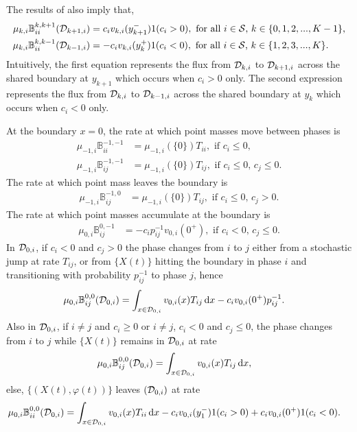 The results of \cite{bo2014} also imply that, 
\begin{align*}
\mu_{k,i}\mathbb B_{ii}^{k,k+1}(\mathcal{D}_{k+1,i})&= c_iv_{k,i}(y_{k+1}^-) 1{(c_i>0)},\mbox{ for all \(i\in\mathcal{S}\), \(k\in\{0,1,2,...,K-1\}\),}
\\\mu_{k,i}\mathbb B_{ii}^{k,k-1}(\mathcal{D}_{k-1,i})&= -c_iv_{k,i}(y_{k}^+) 1{(c_i<0)}, \mbox{  for all \(i\in\mathcal{S}\), \(k\in\{1,2,3,...,K\}\)}.
\end{align*}
Intuitively, the first equation represents the flux from \(\mathcal{D}_{k,i}\) to \(\mathcal{D}_{k+1,i}\) across the shared boundary at \(y_{k+1}\) which occurs when \(c_i>0\) only. The second expression represents the flux from \(\mathcal{D}_{k,i}\) to \(\mathcal{D}_{k-1,i}\) across the shared boundary at \(y_{k}\) which occurs when \(c_i<0\) only. 

At the boundary \(x=0\), the rate at which point masses move between phases is 
\begin{align*}
	\mu_{-1,i}\mathbb B_{ii}^{{-1},{-1}} &= \mu_{-1,i}(\{0\})T_{ii},\mbox{ if } c_i\leq 0,\,\\
	\mu_{-1,i}\mathbb B_{ij}^{{-1},{-1}} &= \mu_{-1,i}(\{0\})T_{ij},\mbox{ if }c_i\leq 0,\,c_j\leq 0. 
	\end{align*}
	The rate at which point mass leaves the boundary is
	\begin{align*}
	\mu_{-1,i}\mathbb B_{ij}^{{-1},0} &= \mu_{-1,i}(\{0\})T_{ij},\mbox{ if }c_i\leq 0,\,c_j> 0. 
	\end{align*}
	The rate at which point masses accumulate at the boundary is 
	\begin{align*}
	\mu_{0,i}\mathbb B_{ij}^{0,{-1}} &= -c_ip^{{-1}}_{ij}v_{0,i}(0^+),\mbox{ if }c_i< 0,\,c_j\leq 0.
	\end{align*}
	In \(\mathcal{D}_{0,i}\), if \(c_i<0\) and \(c_j>0\) the phase changes from \(i\) to \(j\) either from a stochastic jump at rate \(T_{ij}\), or from \(\{X(t)\}\) hitting the boundary in phase \(i\) and transitioning with probability \(p_{ij}^{-1}\) to phase \(j\), hence
	\begin{align*}
	\mu_{0,i}\mathbb B_{ij}^{0,0}(\mathcal{D}_{0,i})&=\int_{x\in\mathcal{D}_{0,i}}v_{0,i}(x)T_{ij}\, \mathrm{d} x - c_iv_{0,i}(0^+)p^{-1}_{ij}.
	\end{align*}
	Also in \(\mathcal{D}_{0,i}\), if \(i\neq j\) and \(c_i\geq 0\) or \(i\neq j\), \(c_i< 0\) and \(c_j\leq 0\), the phase changes from \(i\) to \(j\) while \(\{X(t)\}\) remains in \(\mathcal{D}_{0,i}\) at rate
	\begin{align*}
	\mu_{0,i}\mathbb B_{ij}^{0,0}(\mathcal{D}_{0,i})&=\int_{x\in\mathcal{D}_{0,i}}v_{0,i}(x)T_{ij}\, \mathrm{d} x,
	\end{align*}
	else, \(\{(X(t),\varphi(t))\}\) leaves \((\mathcal{D}_{0,i})\) at rate
	\begin{align*}
	\mu_{0,i}\mathbb B_{ii}^{0,0}(\mathcal{D}_{0,i})&=\int_{x\in\mathcal{D}_{0,i}}v_{0,i}(x)T_{ii}\, \mathrm{d} x - c_iv_{0,i}(y_1^-) 1{(c_i> 0)} + c_iv_{0,i}(0^+)1{(c_i< 0)}.
\end{align*}

